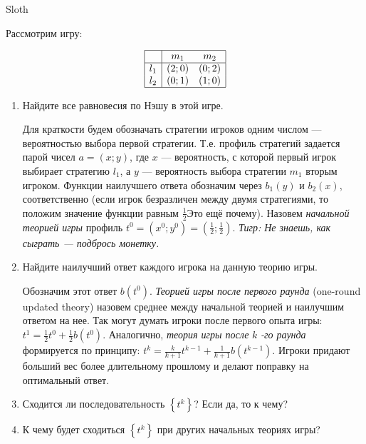 \begin{problem}\par
\begin{source}
Sloth
\end{source}
Рассмотрим игру:

\[\begin{array}{|c|cc|}  \hline {} & {m_{1} } & {m_{2} } \\  \hline {l_{1} } & {\left(2;0\right)} & {\left(0;2\right)} \\ {l_{2} } & {\left(0;1\right)} & {\left(1;0\right)} \\  \hline  \end{array}\]
\begin{enumerate}
\item Найдите все равновесия по Нэшу в этой игре.\par
Для краткости будем обозначать стратегии игроков одним числом --- вероятностью выбора первой стратегии. Т.е. профиль стратегий задается парой чисел  $a=\left(x;y\right)$, где  $x$  --- вероятность, с которой первый игрок выбирает стратегию  $l_{1} $, а  $y$  --- вероятность выбора стратегии  $m_{1} $  вторым игроком. Функции наилучшего ответа обозначим через  $b_{1} \left(y\right)$  и  $b_{2} \left(x\right)$, соответственно (если игрок безразличен между двумя стратегиями, то положим значение функции равным $\frac{1}{2}${\red Это ещё почему}).
Назовем {\it начальной теорией игры} профиль  $t^{0} =\left(x^{0} ;y^{0} \right)=\left(\frac{1}{2} ;\frac{1}{2} \right)$. {\it Тигр: Не знаешь, как сыграть --- подбрось монетку.} \par
\item Найдите наилучший ответ каждого игрока на данную теорию игры.\par
Обозначим этот ответ  $b\left(t^{0} \right)$. {\it Теорией игры после первого раунда} (one-round updated theory) назовем среднее между начальной теорией и наилучшим ответом на нее. Так могут думать игроки после первого опыта игры:  $t^{1} =\frac{1}{2} t^{0} +\frac{1}{2} b\left(t^{0} \right)$. Аналогично, {\it теория игры после } $k$ {\it -го раунда} формируется по принципу:  $t^{k} =\frac{k}{k+1} t^{k-1} +\frac{1}{k+1} b\left(t^{k-1} \right)$. Игроки придают больший вес более длительному прошлому и делают поправку на оптимальный ответ.\par
\item  Сходится ли последовательность  $\left\{t^{k} \right\}$? Если да, то к чему?\par
\item К чему будет сходиться  $\left\{t^{k} \right\}$  при других начальных теориях игры?\par

\end{enumerate}
\end{problem}
